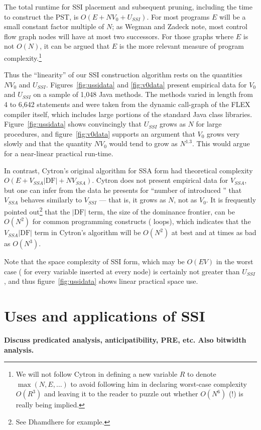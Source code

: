 \documentclass[12pt,titlepage,twoside]{article}
\let\oldsection\section
\renewcommand{\section}{\setcounter{figure}{0}\setcounter{table}{0}\oldsection}
\begin{document}
The total runtime for SSI placement and subsequent pruning, including
the time to construct the PST, is $O(E + N V_0 + U_{SSI})$.  For most
programs $E$ will be a small constant factor multiple of $N$; as
Wegman and Zadeck \cite{wegman91:scc} note, most control flow graph
nodes will have at most two successors.  For those graphs where $E$ is
not $O(N)$, it can be argued that $E$ is the more relevant measure of
program complexity.\footnote{We will not follow Cytron \cite{cytron91:ssa} in
defining a new variable $R$ to denote $\max(N,E,\ldots)$ to avoid
following him in declaring worst-case complexity $O(R^3)$ and leaving
it to the reader to puzzle out whether $O(N^6)$ (!) is really being implied.}

Thus the ``linearity'' of our SSI construction algorithm rests on the
quantities $N V_0$ and $U_{SSI}$.  Figures~\ref{fig:ussidata} and
\ref{fig:v0data} present empirical data for $V_0$ and $U_{SSI}$ on a
sample of 1,048 Java methods.  The methods varied in length from 4
to 6,642 statements and were taken from the dynamic call-graph of the
FLEX compiler itself, which includes large portions of the standard
Java class libraries.  Figure~\ref{fig:ussidata} shows convincingly
that $U_{SSI}$ grows as $N$ for large procedures, and
figure~\ref{fig:v0data} supports an argument that $V_0$ grows very
slowly and that the quantity $N V_0$ would tend to grow as $N^{1.3}$.
This would argue for a near-linear practical run-time.

In contrast, Cytron's original algorithm for SSA form had theoretical
complexity $O(E + V_{SSA} |\text{DF}| + N V_{SSA})$.  Cytron does not
present empirical data for $V_{SSA}$, but one can infer from the data
he presents for ``number of introduced '' that
$V_{SSA}$ behaves similarly to $V_{SSI}$ --- that is, it grows as $N$,
not as $V_0$.  It is frequently pointed out\footnote{See Dhamdhere
\cite{dhamdhere92:large} for example.} that the $|\text{DF}|$
term, the size of the dominance frontier, can be $O(N^2)$ for common
programming constructs ( loops), which indicates that
the $V_{SSA} |\text{DF}|$ term in Cytron's algorithm will be $O(N^2)$
at best and at times as bad as $O(N^3)$.

Note that the space complexity of SSI form, which may be $O(EV)$ in
the worst case ( for every variable inserted at
every node) is certainly not greater than $U_{SSI}$, and thus
figure~\ref{fig:ussidata} shows linear practical space use.

\section{Uses and applications of SSI}
\textbf{Discuss predicated analysis, anticipatibility, PRE, etc.
	Also bitwidth analysis.}%
\end{document}
